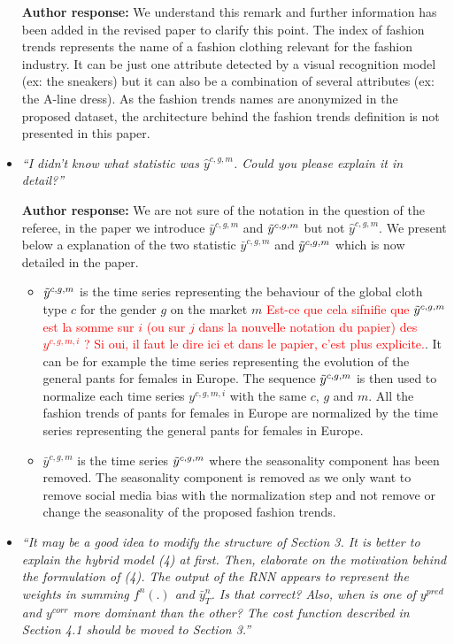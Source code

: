 \documentclass[10pt]{article} %
\begin{document}
\begin{itemize}
	\textbf{Author response:} We understand this remark and further information has been added in the revised paper to clarify this point. The index of fashion trends represents the name of a fashion clothing relevant for the fashion industry. It can be just one attribute detected by a visual recognition model (ex: the sneakers) but it can also be a combination of several attributes (ex: the A-line dress). As the fashion trends names are anonymized in the proposed dataset, the architecture behind the fashion trends definition is not presented in this paper.\\
	
	\item {\em ``I didn't know what statistic was $\hat{y}^{c,g,m}$. Could you please explain it in detail?''} \medskip

	\textbf{Author response:} We are not sure of the notation in the question of the referee, in the paper we introduce $\bar{y}^{c,g,m}$ and $\Tilde{y}^{c,g,m}$ but not $\hat{y}^{c,g,m}$. We present below a explanation of the two statistic $\bar{y}^{c,g,m}$ and $\Tilde{y}^{c,g,m}$ which is now detailed in the paper.
	\begin{itemize}
	\item $\Tilde{y}^{c,g,m}$ is the time series representing the behaviour of the global cloth type $c$ for the gender $g$ on the market $m$ \textcolor{red}{Est-ce que cela sifnifie que $\Tilde{y}^{c,g,m}$  est la somme sur $i$ (ou sur $j$ dans la nouvelle notation du papier) des $y^{c,g,m,i}$ ? Si oui, il faut le dire ici et dans le papier, c'est plus explicite.}. It can be for example the time series representing the evolution of the general pants for females in Europe. The sequence $\Tilde{y}^{c,g,m}$ is then used to normalize each time series $y^{c,g,m,i}$ with the same $c$, $g$ and $m$. All the fashion trends of pants for females in Europe are normalized by the time series representing the general pants for females in Europe.
	\item $\bar{y}^{c,g,m}$ is the time series $\Tilde{y}^{c,g,m}$ where the seasonality component has been removed. The seasonality component is removed as we only want to remove social media bias with the normalization step and not remove or change the seasonality of the proposed fashion trends.
	\end{itemize}	

	\item {\em ``It may be a good idea to modify the structure of Section 3. It is better to explain the hybrid model (4) at first.  Then, elaborate on the motivation behind the formulation of (4). The output of the RNN appears to represent the weights in summing $f^n(.)$ and $\bar{y}^n_{T}$. Is that correct? Also, when is one of $y^{pred}$ and $y^{corr}$ more dominant than the other? The cost function described in Section 4.1 should be moved to Section 3.''} \medskip


\end{itemize}
\end{document}
